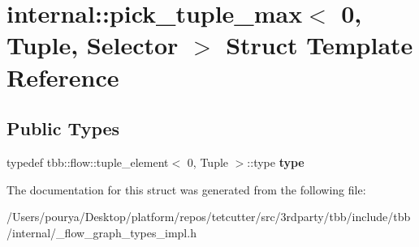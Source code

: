 \hypertarget{structinternal_1_1pick__tuple__max_3_010_00_01Tuple_00_01Selector_01_4}{}\section{internal\+:\+:pick\+\_\+tuple\+\_\+max$<$ 0, Tuple, Selector $>$ Struct Template Reference}
\label{structinternal_1_1pick__tuple__max_3_010_00_01Tuple_00_01Selector_01_4}
\subsection*{Public Types}
\begin{DoxyCompactItemize}
\item 
\hypertarget{structinternal_1_1pick__tuple__max_3_010_00_01Tuple_00_01Selector_01_4_a3c2b75a312f6b257d9b661d78442ed75}{}typedef tbb\+::flow\+::tuple\+\_\+element$<$ 0, Tuple $>$\+::type {\bfseries type}\label{structinternal_1_1pick__tuple__max_3_010_00_01Tuple_00_01Selector_01_4_a3c2b75a312f6b257d9b661d78442ed75}

\end{DoxyCompactItemize}


The documentation for this struct was generated from the following file\+:\begin{DoxyCompactItemize}
\item 
/\+Users/pourya/\+Desktop/platform/repos/tetcutter/src/3rdparty/tbb/include/tbb/internal/\+\_\+flow\+\_\+graph\+\_\+types\+\_\+impl.\+h\end{DoxyCompactItemize}
